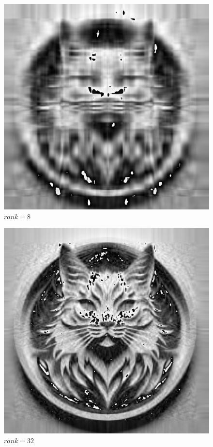 \begin{figure}
  \includegraphics[width=\linewidth]{../image-compression/cat-8.png}
  \caption{$rank=8$}
  \label{fig:cat-bw-rank-8}
\end{figure}

\begin{figure}
  \includegraphics[width=\linewidth]{../image-compression/cat-32.png}
  \caption{$rank=32$}
  \label{fig:cat-bw-rank-32}
\end{figure}


